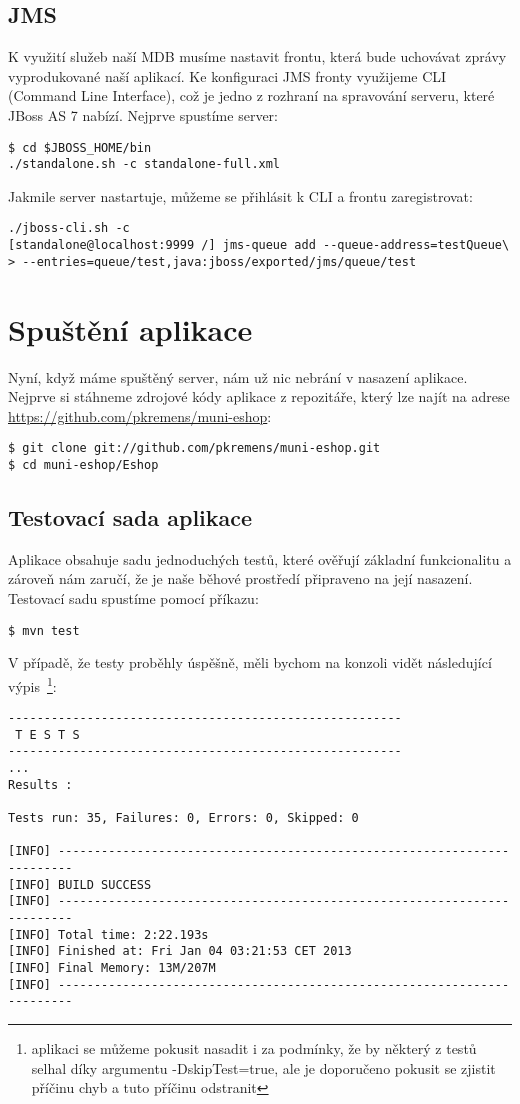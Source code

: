 \documentclass[122pt,oneside]{fithesis}
\begin{document}
\subsection{JMS}
K využití služeb naší MDB musíme nastavit frontu, která bude uchovávat zprávy vyprodukované naší aplikací. Ke konfiguraci JMS fronty využijeme CLI (Command Line Interface), což je jedno z rozhraní na spravování serveru, které JBoss AS 7 nabízí. Nejprve spustíme server:
\begin{lstlisting}
$ cd $JBOSS_HOME/bin
./standalone.sh -c standalone-full.xml
\end{lstlisting}
Jakmile server nastartuje, můžeme se přihlásit k CLI a frontu zaregistrovat:
\begin{lstlisting}
./jboss-cli.sh -c
[standalone@localhost:9999 /] jms-queue add --queue-address=testQueue\
> --entries=queue/test,java:jboss/exported/jms/queue/test
\end{lstlisting}

\section{Spuštění aplikace}
Nyní, když máme spuštěný server, nám už nic nebrání v nasazení aplikace. Nejprve si stáhneme zdrojové kódy aplikace z repozitáře, který lze najít na adrese \href{https://github.com/pkremens/muni-eshop}{https://github.com/pkremens/muni-eshop}:
\begin{lstlisting}
$ git clone git://github.com/pkremens/muni-eshop.git
$ cd muni-eshop/Eshop
\end{lstlisting}

\subsection{Testovací sada aplikace}
Aplikace obsahuje sadu jednoduchých testů, které ověřují základní funkcionalitu a zároveň nám zaručí, že je naše běhové prostředí připraveno na její nasazení. 
Testovací sadu spustíme pomocí příkazu:
\begin{lstlisting}
$ mvn test
\end{lstlisting}
V případě, že testy proběhly úspěšně, měli bychom na konzoli vidět následující výpis~\footnote{aplikaci se můžeme pokusit nasadit i za podmínky, že by některý z testů selhal díky argumentu -DskipTest=true, ale je doporučeno pokusit se zjistit příčinu chyb a tuto příčinu odstranit}:
\begin{lstlisting}
-------------------------------------------------------
 T E S T S
-------------------------------------------------------
...
Results :

Tests run: 35, Failures: 0, Errors: 0, Skipped: 0

[INFO] ------------------------------------------------------------------------
[INFO] BUILD SUCCESS
[INFO] ------------------------------------------------------------------------
[INFO] Total time: 2:22.193s
[INFO] Finished at: Fri Jan 04 03:21:53 CET 2013
[INFO] Final Memory: 13M/207M
[INFO] ------------------------------------------------------------------------
\end{lstlisting}
\end{document}
